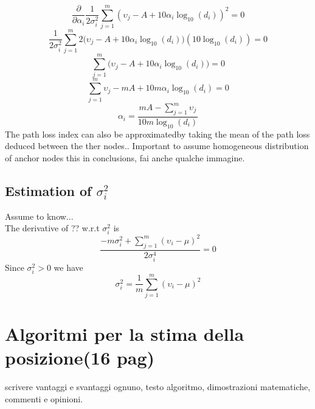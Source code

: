 \documentclass[12pt,twoside]{report}
\begin{document}
\begin{equation}
\frac{\partial}{\partial \alpha_i} \frac{1}{2\sigma^2_i}\sum_{j=1}^m(\upsilon_j-A+10\alpha_i\log_{10}(d_i))^2 =0
\end{equation}
\begin{equation}
\frac{1}{2\sigma^2_i}\sum_{j=1}^m2\big(\upsilon_j-A+10\alpha_i\log_{10}(d_i)\big)(10\log_{10}(d_i)) =0
\end{equation}
\begin{equation}
\sum_{j=1}^m\big(\upsilon_j-A+10\alpha_i\log_{10}(d_i)\big) =0
\end{equation}
\begin{equation}
\sum_{j=1}^m\upsilon_j-mA+10m\alpha_i\log_{10}(d_i)=0
\end{equation}
\begin{equation}
    \alpha_i=\frac{mA-\sum_{j=1}^m\upsilon_j}{10m\log_{10}(d_i)}
\end{equation}
The path loss index can also be approximatedby taking the mean of the path loss deduced between the ther nodes..
Important to assume homogeneous distribution of anchor nodes this in conclusions, fai anche qualche immagine.
\section{Estimation of $\sigma^2_i$}
Assume to know...\\
The derivative of ?? w.r.t $\sigma^2_i$ is 
\begin{equation}
    \frac{-m\sigma^2_i+\sum_{j=1}^m(\upsilon_i-\mu)^2}{2\sigma^4_i}=0
\end{equation}
Since $\sigma^2_i>0$ we have
\begin{equation}
    \sigma^2_i=\frac{1}{m}\sum_{j=1}^m(\upsilon_i-\mu)^2
\end{equation}

\clearpage

\chapter{Algoritmi per la stima della posizione(16 pag)}
scrivere vantaggi e svantaggi ognuno, testo algoritmo, dimostrazioni matematiche, commenti e opinioni.
\end{document}
